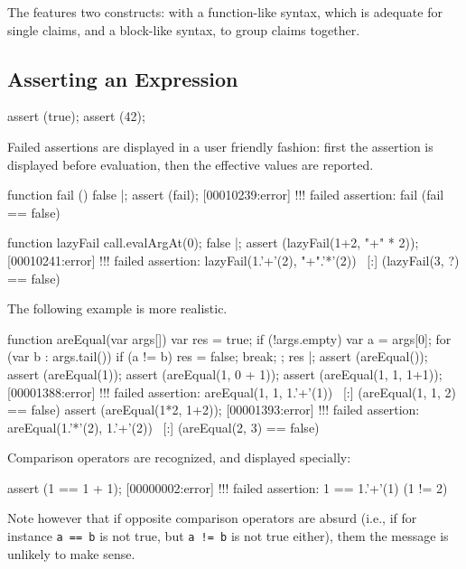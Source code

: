 The  features two constructs: with a function-like syntax,
which is adequate for single claims, and a block-like syntax, to group
claims together.

\subsection{Asserting an Expression}

\begin{urbiscript}
assert (true);
assert (42);
\end{urbiscript}

Failed assertions are displayed in a user friendly fashion: first the
assertion is displayed before evaluation, then the effective values are
reported.

\begin{urbiscript}
function fail () { false }|;
assert (fail);
[00010239:error] !!! failed assertion: fail (fail == false)

function lazyFail { call.evalArgAt(0); false }|;
assert (lazyFail(1+2, "+" * 2));
[00010241:error] !!! failed assertion: lazyFail(1.'+'(2), "+".'*'(2)) \
[:]                  (lazyFail(3, ?) == false)
\end{urbiscript}

The following example is more realistic.

\begin{urbiscript}
function areEqual(var args[])
{
  var res = true;
  if (!args.empty)
  {
    var a = args[0];
    for (var b : args.tail())
      if (a != b)
      {
        res = false;
        break;
      }
  };
  res
}|;
assert (areEqual());
assert (areEqual(1));
assert (areEqual(1, 0 + 1));
assert (areEqual(1, 1, 1+1));
[00001388:error] !!! failed assertion: areEqual(1, 1, 1.'+'(1)) \
[:]              (areEqual(1, 1, 2) == false)
assert (areEqual(1*2, 1+2));
[00001393:error] !!! failed assertion: areEqual(1.'*'(2), 1.'+'(2)) \
[:]              (areEqual(2, 3) == false)
\end{urbiscript}

Comparison operators are recognized, and displayed specially:
\begin{urbiscript}
assert (1 == 1 + 1);
[00000002:error] !!! failed assertion: 1 == 1.'+'(1) (1 != 2)
\end{urbiscript}

Note however that if opposite comparison operators are absurd (i.e., if for
instance \lstinline|a == b| is not true, but \lstinline|a != b| is not true
either), them the message is unlikely to make sense.

